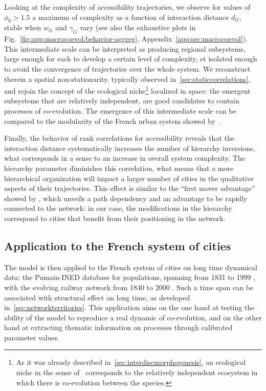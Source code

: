 Looking at the complexity of accessibility trajectories, we observe for values of $\phi_0 > 1.5$ a maximum of complexity as a function of interaction distance $d_G$, stable when $w_G$ and $\gamma_G$ vary (see also the exhaustive plots in Fig.~\ref{fig:app:macrocoevol:behavior-aggreg}, Appendix~\ref{app:sec:macrocoevol}). This intermediate scale can be interpreted as producing regional subsystems, large enough for each to develop a certain level of complexity, et isolated enough to avoid the convergence of trajectories over the whole system. We reconstruct therein a spatial non-stationarity, typically observed in~\ref{sec:staticcorrelations}, and rejoin the concept of the ecological niche\footnote{As it was already described in~\ref{sec:interdiscmorphogenesis}, an ecological niche in the sense of~\cite{holland2012signals} corresponds to the relatively independent ecosystem in which there is co-evolution between the species.} localized in space: the emergent subsystems that are relatively independent, are good candidates to contain processes of co-evolution. The emergence of this intermediate scale can be compared to the modularity of the French urban system showed by~\cite{berroir2017systemes}.



Finally, the behavior of rank correlations for accessibility reveals that the interaction distance systematically increases the number of hierarchy inversions, what corresponds in a sense to an increase in overall system complexity. The hierarchy parameter diminishes this correlation, what means that a more hierarchical organization will impact a larger number of cities in the qualitative aspects of their trajectories. This effect is similar to the ``first mover advantage'' showed by \cite{levinson2011does}, which unveils a path dependency and an advantage to be rapidly connected to the network: in our case, the modifications in the hierarchy correspond to cities that benefit from their positioning in the network.



\subsection{Application to the French system of cities}


The model is then applied to the French system of cities on long time dynamical data: the Pumain-INED database for populations, spanning from 1831 to 1999 \cite{pumain1986fichier}, with the evolving railway network from 1840 to 2000 \cite{thevenin2013mapping}. Such a time span can be associated with structural effect on long time, as developed in~\ref{sec:networkterritories}. This application aims on the one hand at testing the ability of the model to reproduce a real dynamic of co-evolution, and on the other hand at extracting thematic information on processes through calibrated parameter values.

